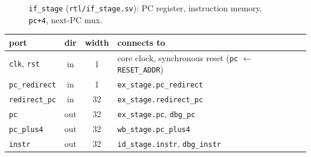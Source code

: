 \documentclass[10pt]{article}
\newcommand{\sv}[1]{\texttt{#1}}
\begin{document}
\begin{figure}[h]
  \centering
  
  \caption{\sv{if\_stage} (\sv{rtl/if\_stage.sv}): PC register, instruction memory, \sv{pc+4}, next-PC mux.}
\end{figure}
\begin{center}\small
\begin{tabular}{l c c L{11cm}}
\toprule
port & dir & width & connects to\\ \midrule
\sv{clk}, \sv{rst} & in & 1 & core clock, synchronous reset (\sv{pc} $\leftarrow$ \sv{RESET\_ADDR})\\
\sv{pc\_redirect} & in & 1 & \sv{ex\_stage.pc\_redirect}\\
\sv{redirect\_pc} & in & 32 & \sv{ex\_stage.redirect\_pc}\\
\sv{pc} & out & 32 & \sv{ex\_stage.pc}, \sv{dbg\_pc}\\
\sv{pc\_plus4} & out & 32 & \sv{wb\_stage.pc\_plus4}\\
\sv{instr} & out & 32 & \sv{id\_stage.instr}, \sv{dbg\_instr}\\ \bottomrule
\end{tabular}
\end{center}
\end{document}
